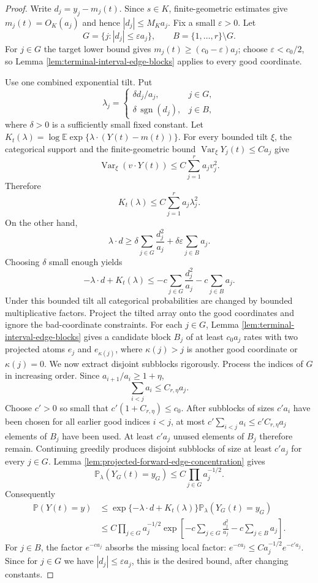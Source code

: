 \documentclass[11pt]{article}
\theoremstyle{remark}
\newcommand{\Pp}{\mathbb P}
\newcommand{\Ee}{\mathbb E}
\newcommand{\Var}{\operatorname{Var}}
\begin{document}
\begin{proof}
Write $d_j=y_j-m_j(t)$.  Since $s\in K$, finite-geometric estimates give
$m_j(t)=O_K(a_j)$ and hence $|d_j|\le M_Ka_j$.  Fix a small
$\varepsilon>0$.  Let
\[
        G=\{j: |d_j|\le\varepsilon a_j\},
        \qquad B=\{1,\ldots,r\}\setminus G .
\]
For $j\in G$ the target lower bound gives
$m_j(t)\ge(c_0-\varepsilon)a_j$; choose
$\varepsilon<c_0/2$, so Lemma \ref{lem:terminal-interval-edge-blocks}
applies to every good coordinate.

Use one combined exponential tilt.  Put
\[
        \lambda_j=
        \begin{cases}
        \delta d_j/a_j, & j\in G,\\
        \delta\,\operatorname{sgn}(d_j), & j\in B,
        \end{cases}
\]
where $\delta>0$ is a sufficiently small fixed constant.  Let
$K_t(\lambda)=\log\Ee\exp\{\lambda\cdot(Y(t)-m(t))\}$.
For every bounded tilt $\xi$, the categorical support and the finite-geometric
bound $\Var_\xi Y_j(t)\le C a_j$ give
\[
        \Var_\xi(v\cdot Y(t))\le C\sum_{j=1}^r a_jv_j^2.
\]
Therefore
\[
        K_t(\lambda)\le C\sum_{j=1}^r a_j\lambda_j^2 .
\]
On the other hand,
\[
        \lambda\cdot d
        \ge \delta\sum_{j\in G}\frac{d_j^2}{a_j}
            +\delta\varepsilon\sum_{j\in B}a_j .
\]
Choosing $\delta$ small enough yields
\[
        -\lambda\cdot d+K_t(\lambda)
        \le -c\sum_{j\in G}\frac{d_j^2}{a_j}
             -c\sum_{j\in B}a_j .
\]
Under this bounded tilt all categorical probabilities are changed by bounded
multiplicative factors.  Project the tilted array onto the good coordinates
and ignore the bad-coordinate constraints.  For each $j\in G$, Lemma \ref{lem:terminal-interval-edge-blocks} gives a candidate block $B_j$ of at least $c_0a_j$
rates with two projected atoms $e_j$ and $e_{\kappa(j)}$, where
$\kappa(j)>j$ is another good coordinate or $\kappa(j)=0$.  We now extract
disjoint subblocks rigorously.  Process the indices of $G$ in increasing order.
Since $a_{i+1}/a_i\ge1+\eta$,
\[
        \sum_{i<j}a_i\le C_{r,\eta}a_j.
\]
Choose $c'>0$ so small that
$c'(1+C_{r,\eta})\le c_0$.  After subblocks of sizes $c'a_i$ have been chosen
for all earlier good indices $i<j$, at most
$c'\sum_{i<j}a_i\le c'C_{r,\eta}a_j$ elements of $B_j$ have been used.
At least $c'a_j$ unused elements of $B_j$ therefore remain.  Continuing
greedily produces disjoint subblocks of size at least $c'a_j$ for every
$j\in G$.
Lemma \ref{lem:projected-forward-edge-concentration} gives
\[
        \Pp_\lambda(Y_G(t)=y_G)\le C\prod_{j\in G}a_j^{-1/2}.
\]
Consequently
\begin{align*}
        \Pp(Y(t)=y)
        &\le \exp\{-\lambda\cdot d+K_t(\lambda)\}
        \Pp_\lambda(Y_G(t)=y_G)  \\
        &\le C\prod_{j\in G}a_j^{-1/2}
        \exp\left[-c\sum_{j\in G}\frac{d_j^2}{a_j}
                  -c\sum_{j\in B}a_j\right].
\end{align*}
For $j\in B$, the factor $e^{-ca_j}$ absorbs the missing local factor:
$e^{-ca_j}\le C a_j^{-1/2}e^{-c'a_j}$.  Since for $j\in G$ we have
$|d_j|\le\varepsilon a_j$, this is the desired bound, after changing
constants.

\end{proof}
\end{document}
